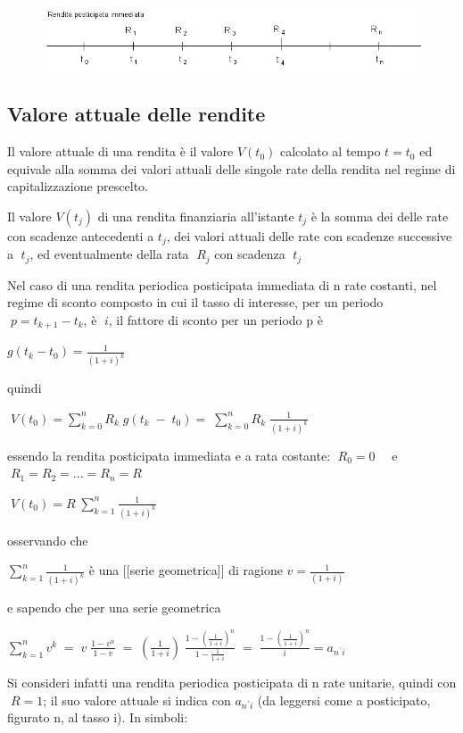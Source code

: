 \begin{figure}[htp]
\centering
\includegraphics[scale=.60]{img/rendite.png}
\caption{}
\label{}
\end{figure}

\subsection{Valore attuale delle rendite}
Il valore attuale di una rendita è il valore $V(t_0)$  calcolato al tempo $t = 
t_0$  ed equivale alla somma dei valori attuali delle singole rate della 
rendita nel regime di capitalizzazione prescelto.

Il valore $V(t_j)$ di una rendita finanziaria all'istante $t_j$ è la somma dei 
delle rate con scadenze antecedenti a $t_j$, dei valori attuali delle rate con 
scadenze successive a $\;t_j$, ed eventualmente della rata $\;R_j$ con scadenza 
$\;t_j$ 


Nel caso di una rendita periodica posticipata immediata di n rate costanti, nel 
regime di sconto composto in cui il tasso di interesse, per un periodo $\; p= 
t_{k+1}-t_k$, è $\;i$, il fattore di sconto per un periodo p è

$g(t_k-t_0)=\frac{1}{(1+i)^k}$

quindi

$\; V(t_0)=\sum^{n}_{k=0}R_k \; g(t_k\;-\;t_0)= \; \sum^{n}_{k=0}R_k \; 
\frac{1}{(1+i)^k}$

essendo la rendita posticipata immediata e a rata costante: $\;R_{0}=0 \quad$ e 
$\;R_{1}=R_{2}=...=R_{n}=R$

$\; V(t_0)= R\; \sum^{n}_{k=1}\frac{1}{(1+i)^k}$

osservando che

$\sum^{n}_{k=1}\frac{1}{(1+i)^k}$ è una [[serie geometrica]] di ragione 
$v=\frac{1}{(1+i)}$

e sapendo che per una serie geometrica

$\sum^{n}_{k=1}v^k\; =\; v\; \frac{1-v^n}{1-v}\;=\;\left( \frac{1}{1+i}\right) 
\;\frac{1-(\frac{1}{1+i})^n}{1-\frac{1}{1+i}}\; = \; 
\frac{1-(\frac{1}{1+i})^n}{i}= a_{n^\urcorner i}$

Si consideri infatti una rendita periodica posticipata di n rate unitarie, 
quindi con $\;R=1$; il suo valore attuale si indica con $a_{n^\urcorner i}$ (da 
leggersi come a posticipato, figurato n, al tasso i). 
In simboli:

